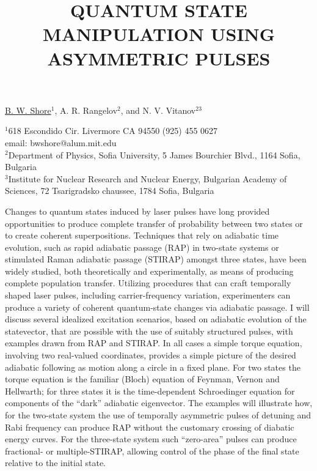 \title{QUANTUM STATE MANIPULATION USING ASYMMETRIC PULSES}

\underline{B. W. Shore}$^1$, A. R. Rangelov$^2$, and N. V. Vitanov$^{23}$


$^1$618 Escondido Cir.
Livermore CA 94550
(925) 455 0627\\
email: bwshore@alum.mit.edu\\
$^2$Department of Physics, Sofia University, 5 James Bourchier Blvd., 1164
Sofia, Bulgaria\\
$^3$Institute for Nuclear Research and Nuclear Energy,
Bulgarian Academy of Sciences,
72 Tsarigradsko chaussee,
1784 Sofia, Bulgaria

Changes to quantum states induced by laser pulses have long provided
opportunities to produce complete transfer of probability between two
states or to create coherent superpositions. Techniques that rely on
adiabatic time evolution, such as rapid adiabatic passage (RAP) in two-state
systems or stimulated Raman adiabatic passage (STIRAP)  amongst
three states, have been widely studied, both theoretically and
experimentally, as means of producing complete population transfer.
Utilizing procedures that can craft temporally shaped laser pulses,
including carrier-frequency variation,  experimenters can produce a
variety of coherent quantum-state changes via adiabatic passage.  I
will discuss several idealized excitation scenarios, based on
adiabatic evolution of the statevector,  that are possible with the
use of suitably structured pulses, with examples drawn from RAP and
STIRAP.  In all cases a simple torque equation, involving two real-valued
coordinates,  provides a simple picture of the desired
adiabatic following as motion along a circle in a fixed plane. For two
states the torque equation is the familiar (Bloch) equation of
Feynman, Vernon and Hellwarth; for three states it is the time-dependent
Schroedinger equation for components of the ``dark'' adiabatic
eigenvector.  The examples will illustrate how, for the two-state
system the use of temporally asymmetric pulses of detuning and Rabi
frequency can produce RAP without the customary crossing of diabatic
energy curves. For the three-state system such ``zero-area'' pulses can
produce fractional- or multiple-STIRAP, allowing control of the phase
of the final state relative to the initial state.

\vspace{\baselineskip}